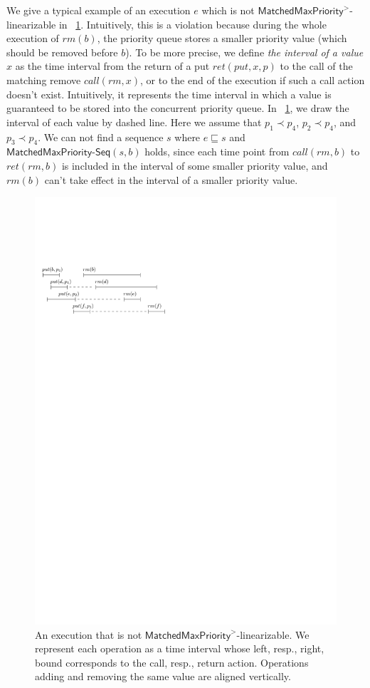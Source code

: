 We give a typical example of an execution $e$ which is not $\mathsf{MatchedMaxPriority}^>$-linearizable in
\figurename~\ref{fig:introduce gap for EPQ1Lar}. Intuitively, this is a violation because during the whole execution of $\textit{rm}(b)$, the priority queue stores a smaller priority value (which should be removed before $b$). To be more precise, we define \emph{the interval of a value $x$} as the time interval from the return of a put $\textit{ret}(\textit{put},x,p)$ to the call of the matching remove $\textit{call}(rm,x)$, or to the end of the execution if such a call action doesn't exist. Intuitively, it represents the time interval in which a value is guaranteed to be stored into the concurrent priority queue.
In \figurename~\ref{fig:introduce gap for EPQ1Lar}, we draw the interval of each value by dashed line. Here we assume that $p_1 \prec p_4$, $p_2 \prec p_4$, and $p_3 \prec p_4$. We can not find a sequence $s$ where $e \sqsubseteq s$ and $\mathsf{MatchedMaxPriority}\mathsf{\text{-}Seq}(s,b)$ holds, since each time point from $\textit{call}(\textit{rm},b)$ to $\textit{ret}(\textit{rm},b)$ is included in the interval of some smaller priority value, and $\textit{rm}(b)$ can't take effect in the interval of a smaller priority value.

\begin{figure}[htbp]
  \centering
  \includegraphics[width=0.4 \textwidth]{figures/PIC-HIS-INTRO-GAP-EPQ1L.pdf}
  \caption{An execution that is not $\mathsf{MatchedMaxPriority}^{>}$-linearizable. We represent each operation as a time interval whose left, resp., right, bound corresponds to the call, resp., return action. Operations adding and removing the same value are aligned vertically.}
  \label{fig:introduce gap for EPQ1Lar}
\end{figure}

